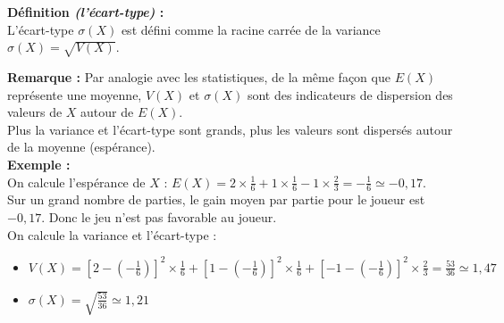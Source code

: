 \documentclass[11pt,a4paper]{article}
\begin{document}
\begin{mdframed}[style=definitionStyle]
    \textbf{Définition \emph{(l'écart-type)} :} ~\\
    L'écart-type $\sigma(X)$ est défini comme la racine carrée de la variance $\sigma(X)=\sqrt{V(X)}$.
\end{mdframed}

\textbf{Remarque :} Par analogie avec les statistiques, de la même façon que $E(X)$ représente une moyenne, $V(X)$ et $\sigma(X)$ sont des indicateurs de dispersion des valeurs de $X$ autour de $E(X)$. \\
Plus la variance et l'écart-type sont grands, plus les valeurs sont dispersés autour de la moyenne (espérance). \\

\textbf{Exemple :} ~\\
On calcule l'espérance de $X$ :
$\displaystyle E(X)=2\times\frac{1}{6}+1\times\frac{1}{6}-1\times\frac{2}{3}=-\frac{1}{6}\simeq-0,17$. \\
Sur un grand nombre de parties, le gain moyen par partie pour le joueur est $-0,17$. Donc le jeu n'est pas favorable au joueur. \\

On calcule la variance et l'écart-type :
\begin{itemize}
    \item $\displaystyle V(X)=\left[2-\left(-\frac{1}{6}\right)\right]^2\times \frac{1}{6}+\left[1-\left(-\frac{1}{6}\right)\right]^2\times \frac{1}{6}+\left[-1-\left(-\frac{1}{6}\right)\right]^2\times \frac{2}{3}=\frac{53}{36}\simeq1,47$
    \item $\displaystyle \sigma(X)=\sqrt{\frac{53}{36}}\simeq1,21$
\end{itemize}
\end{document}

